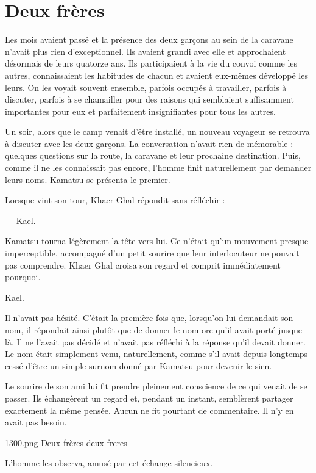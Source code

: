 \chapter{Deux frères}
\label{chap:deux-freres}

Les mois avaient passé et la présence des deux garçons au sein de la caravane
n'avait plus rien d'exceptionnel. Ils avaient grandi avec elle et approchaient
désormais de leurs quatorze ans. Ils participaient à la vie du convoi comme les
autres, connaissaient les habitudes de chacun et avaient eux-mêmes développé
les leurs. On les voyait souvent ensemble, parfois occupés à travailler,
parfois à discuter, parfois à se chamailler pour des raisons qui semblaient
suffisamment importantes pour eux et parfaitement insignifiantes pour tous les
autres.

Un soir, alors que le camp venait d'être installé, un nouveau voyageur se
retrouva à discuter avec les deux garçons. La conversation n'avait rien de
mémorable : quelques questions sur la route, la caravane et leur prochaine
destination. Puis, comme il ne les connaissait pas encore, l'homme finit
naturellement par demander leurs noms. Kamatsu se présenta le premier.

Lorsque vint son tour, Khaer Ghal répondit sans réfléchir :

— Kael.

Kamatsu tourna légèrement la tête vers lui. Ce n'était qu'un mouvement presque
imperceptible, accompagné d'un petit sourire que leur interlocuteur ne pouvait
pas comprendre. Khaer Ghal croisa son regard et comprit immédiatement pourquoi.

Kael.

Il n'avait pas hésité. C'était la première fois que, lorsqu'on lui demandait
son nom, il répondait ainsi plutôt que de donner le nom orc qu'il avait porté
jusque-là. Il ne l'avait pas décidé et n'avait pas réfléchi à la réponse qu'il
devait donner. Le nom était simplement venu, naturellement, comme s'il avait
depuis longtemps cessé d'être un simple surnom donné par Kamatsu pour devenir
le sien.

Le sourire de son ami lui fit prendre pleinement conscience de ce qui venait
de se passer. Ils échangèrent un regard et, pendant un instant, semblèrent
partager exactement la même pensée. Aucun ne fit pourtant de commentaire. Il
n'y en avait pas besoin.

\illustration
  {1300.png}
  {Deux frères}
  {deux-freres}

L'homme les observa, amusé par cet échange silencieux.

